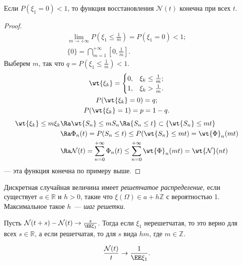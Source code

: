  \begin{theorem}
     Если $P(\xi_1 = 0 ) < 1$, то функция восстановления $\mathcal{N}(t)$ конечна при всех $t$.
 \end{theorem}

 \begin{proof}
 \begin{gather*}
     \lim\limits_{m\rightarrow +\infty} P(\xi_1\le\tfrac{1}{m}) = P(\xi_1 = 0) < 1; \\
     \{0\} = \bigcap\limits_{m=1} ^ {+\infty} \left[0, \frac{1}{m}\right].
 \end{gather*}
     Выберем $m$, так что $q= P(\xi_1\le \frac{1}{m}) < 1$.
    \begin{gather*}
        \wt{\xi_k} = \begin{cases}
        0, & \xi_k \le \frac{1}{m};\\
        1, & \xi_k > \frac{1}{m}.
        \end{cases}\\
        P(\wt{\xi_k} = 0) = q;\\
        P(\wt{\xi_k} = 1) = p = 1-q.
    \end{gather*}
    \begin{align*}
        \wt{\xi_k}\le m\xi_k &\Ra \wt{S_n} \le mS_n \Ra \{S_n \le t\} \subset\{\wt{S_n}\le mt\}
        \\&\Ra \Phi_n(t) = P(S_n\le t) \le P(\wt{S_n} \le mt) = \wt{\Phi}_n(mt) \\&\Ra \mathcal{N}(t) =
         \sum\limits_{n=0} ^ {+\infty} \Phi_n(t) \le \sum\limits_{n=0} ^ {+\infty} \wt{\Phi}_n(mt) = \wt{\mathcal{N}}(nt)
    \end{align*}
    --- эта функция конечна по примеру выше.
 \end{proof}

 \begin{definition}
     Дискретная случайная величина имеет \textit{решетчатое распределение}, если существует $a\in\mathbb{R}$ и $h>0$, такие что $\xi(\Omega) \in a+h\mathbb{Z}$ с
     вероятностью 1. Максимальное такое $h$~--- \textit{шаг решетки}.
 \end{definition}


 \begin{theorem}[восстановления]
    Пусть $\mathcal{N}(t+s) - \mathcal{N}(t) \rightarrow \frac{s}{\EE \xi_1}$. Тогда
     если $\xi_1$ нерешетчатая, то это верно для всех $s\in\mathbb{R}$, а если решетчатая, то для $s$ вида $hm$, где $m\in\mathbb{Z}$.
 \end{theorem}

 \begin{corollary}
     $$\frac{\mathcal{N}(t)}{t}\rightarrow \frac{1}{\EE \xi_1}.$$
 \end{corollary}

